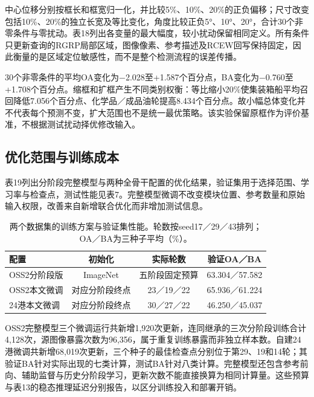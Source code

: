 \documentclass[journal,10pt,a4paper]{IEEEtran}
\begin{document}
中心位移分别按框长和框宽归一化，并比较5\%、10\%、20\%的正负偏移；尺寸改变包括10\%、20\%的独立长宽及等比变化，角度比较正负5°、10°、20°，合计30个非零条件与零扰动。表18列出各变量的最大幅度，较小扰动保留相同定义。所有条件只更新查询的RGRP局部区域，图像像素、参考描述及RCEW回写保持固定，因此衡量的是区域定位敏感性，而不是整个检测流程的误差传播。

30个非零条件的平均OA变化为−2.028至+1.587个百分点，BA变化为−0.760至+1.708个百分点。缩框和扩框产生不同类别权衡：等比缩小20\%使集装箱船平均召回降低7.056个百分点、化学品／成品油轮提高8.434个百分点。故小幅总体变化并不代表每个预测不变，扩大范围也不是统一最优策略。该实验保留原框作为评价基准，不根据测试扰动择优修改输入。

\subsection{优化范围与训练成本}\label{ux4f18ux5316ux8303ux56f4ux4e0eux8badux7ec3ux6210ux672c}

表19列出分阶段完整模型与两种全骨干配置的优化结果，验证集用于选择范围、学习率与检查点，测试性能见表7。完整模型微调不改变模块位置、参考数量和原始输入权限，改善来自新增联合优化而非增加测试信息。

\begin{table}[H]
\centering\footnotesize
\setcounter{table}{18}
\caption{两个数据集的训练方案与验证集性能。轮数按seed17／29／43排列；OA／BA为三种子平均（\%）。}
\label{tab:19}
\setlength{\tabcolsep}{3pt}\renewcommand{\arraystretch}{1.2}
\begin{tabularx}{\linewidth}{LCCC}
\toprule
配置 & 初始化 & 实际轮数 & 验证OA／BA \\
\midrule
OSS2分阶段版 & ImageNet & 五阶段固定预算 & 63.304／57.582 \\
OSS2本文微调 & 对应分阶段终点 & 23／19／22 & 65.936／61.224 \\
24港本文微调 & 对应分阶段终点 & 30／27／22 & 46.250／45.037 \\
\bottomrule
\end{tabularx}
\end{table}

OSS2完整模型三个微调运行共新增1,920次更新，连同继承的三次分阶段训练合计4,128次，源图像暴露次数为96,356，属于重复训练暴露而非独立样本数。自建24港微调共新增68,019次更新，三个种子的最佳检查点分别位于第29、19和14轮；其验证BA针对实际出现的七类计算，测试BA针对八类计算。完整模型还包含参考前向、辅助监督与历史分阶段学习，更新次数不能直接换算为相同计算量。这些预算与表13的稳态推理延迟分别报告，以区分训练投入和部署开销。
\end{document}
